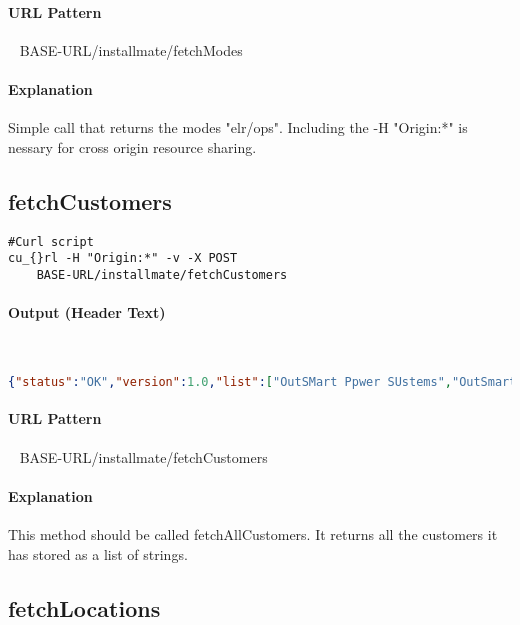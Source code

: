 \documentclass[
10pt, %
letterpaper, %
oneside, %
headinclude,footinclude, %
BCOR5mm, %
]{scrartcl}
\begin{document}
\paragraph{URL Pattern} 
~\newline
BASE-URL/installmate/fetchModes

\paragraph{Explanation} Simple call that returns the modes "elr/ops". Including the -H "Origin:*" is nessary for cross origin resource sharing. 



\subsection{\textbf{fetchCustomers}}

\begin{lstlisting}
#Curl script
cu_{}rl -H "Origin:*" -v -X POST 
	BASE-URL/installmate/fetchCustomers
\end{lstlisting}

\paragraph{Output (Header Text)}~
\begin{lstlisting}[language=json]
{"status":"OK","version":1.0,"list":["OutSMart Ppwer SUstems","OutSmart Power Systems","laber"]}
\end{lstlisting}

\paragraph{URL Pattern} 
~\newline
BASE-URL/installmate/fetchCustomers

\paragraph{Explanation} This method should be called fetchAllCustomers. It returns all the customers it has stored as a list of strings.



\subsection{\textbf{fetchLocations}}
\end{document}
